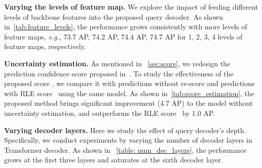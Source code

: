 \documentclass[runningheads]{llncs}
\begin{document}
\noindent\textbf{Varying the levels of feature map.} 
We explore the impact of feeding different levels of backbone features into the proposed query decoder. As shown in~\cref{tab:feature_levels}, the performance grows consistently with more levels of feature maps, \textit{e.g.},   73.7 AP, 74.2 AP,  74.4 AP,
74.7 AP for 
1, 2, 3, 4 levels of feature maps, respectively.







\noindent\textbf{Uncertainty estimation.} 
As mentioned in ~\cref{sec:score}, we redesign the prediction confidence score proposed in~\cite{li2021rle}. To study the effectiveness of the proposed score , we compare it with predictions without re-score and predictions with RLE score~\cite{li2021rle} using the same model. As shown in~\cref{tab:score_estimation}, the proposed method brings significant improvement (4.7 AP) to the model without uncertainty estimation, and outperforms the RLE score~\cite{li2021rle} by 1.0 AP.









\noindent\textbf{Varying decoder layers.} Here we study the effect of query decoder's depth.
Specifically, we conduct experiments by varying the number of decoder layers in Transformer decoder. 
As shown in ~\cref{table: num_dec_layers}, the performance grows at the first three layers and saturates at the sixth decoder layer. 
\end{document}
